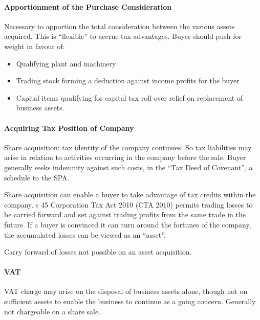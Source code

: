 \documentclass[
]{article}
\providecommand{\tightlist}{%
  \setlength{\itemsep}{0pt}\setlength{\parskip}{0pt}}
\begin{document}
\hypertarget{apportionment-of-the-purchase-consideration}{%
\paragraph{Apportionment of the Purchase
Consideration}\label{apportionment-of-the-purchase-consideration}}

Necessary to apportion the total consideration between the various
assets acquired. This is ``flexible'' to accrue tax advantages. Buyer
should push for weight in favour of:

\begin{itemize}
\tightlist
\item
  Qualifying plant and machinery
\item
  Trading stock forming a deduction against income profits for the buyer
\item
  Capital items qualifying for capital tax roll-over relief on
  replacement of business assets.
\end{itemize}

\hypertarget{acquiring-tax-position-of-company}{%
\paragraph{Acquiring Tax Position of
Company}\label{acquiring-tax-position-of-company}}

Share acquisition: tax identity of the company continues. So tax
liabilities may arise in relation to activities occurring in the company
before the sale. Buyer generally seeks indemnity against such costs, in
the ``Tax Deed of Covenant'', a schedule to the SPA.

Share acquisition can enable a buyer to take advantage of tax credits
within the company. s 45 Corporation Tax Act 2010 (CTA 2010) permits
trading losses to be carried forward and set against trading profits
from the same trade in the future. If a buyer is convinced it can turn
around the fortunes of the company, the accumulated losses can be viewed
as an ``asset''.

Carry forward of losses not possible on an asset acquisition.

\hypertarget{vat}{%
\paragraph{VAT}\label{vat}}

VAT charge may arise on the disposal of business assets alone, though
not on sufficient assets to enable the business to continue as a going
concern. Generally not chargeable on a share sale.
\end{document}

